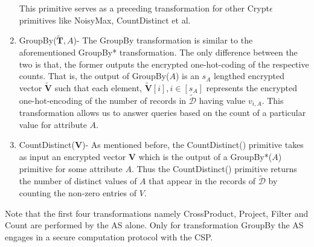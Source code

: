 \begin{enumerate}
    This primitive serves as a preceding transformation for other Crypt$\epsilon$ primitives like \textsf{NoisyMax}, \textsf{CountDistinct} et al.
     \item{GroupBy($\mathbf{\tilde{T}},A$)-} The \textsf{GroupBy} transformation is similar to the aforementioned \textsf{GroupBy*} transformation. The only difference between the two is that, the former outputs the encrypted one-hot-coding of the respective counts. That is, the output of \textsf{GroupBy}($A$)  is an $s_A$ lengthed encrypted vector $\tilde{\mathbf{V}}$ such that each element, $\tilde{\mathbf{V}}[i], i \in [s_A]$ represents the encrypted one-hot-encoding of the number of records in $\boldsymbol{\tilde{\mathcal{D}}}$ having value $v_{i,A}$. This transformation allows us to answer queries based on the count of a particular value for attribute $A$.
     \item {CountDistinct($\mathbf{V}$)-} As mentioned before, the \textsf{CountDistinct()} primitive takes as input an encrypted vector $\mathbf{V}$ which is the output of a \textsf{GroupBy*}($A$) primitive for some attribute $A$. Thus the \textsf{CountDistinct}() primitive  returns the number of distinct values of $A$ that appear in the records of $\boldsymbol{\tilde{\mathcal{D}}}$ by counting the non-zero entries of $V$.  
\end{enumerate}
Note that the first four transformations namely \textsf{CrossProduct, Project, Filter} and Count are performed by the \textsf{AS} alone. Only for transformation \textsf{GroupBy} the \textsf{AS} engages in a secure computation protocol with the \textsf{CSP}.
